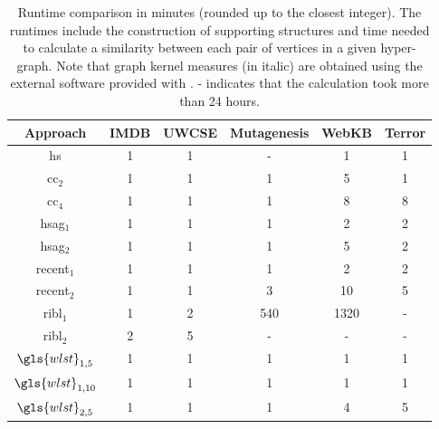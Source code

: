 \begin{table}
	\begin{center}
		\small
		\caption[Runtime comparison of various relational clustering approaches]{Runtime comparison in minutes (rounded up to the closest integer). The runtimes include the construction of supporting structures and time needed to calculate a similarity between each pair of vertices in a given hyper-graph. Note that graph kernel measures (in italic) are obtained using the external software provided with \cite{NIPS2015_5688}. - indicates that the calculation took more than 24 hours. }
			\label{tab:Runtimes}
		\begin{tabular}[htb]{@{}cccccc@{}}
		\toprule
		\textbf{Approach } & \textbf{IMDB}     & \textbf{UWCSE} &   \textbf{Mutagenesis}   &   \textbf{WebKB}   &  \textbf{Terror} \\
		\midrule
		\gls{hs} 		 		&	1		&	1	   &  	-	  &		1	   &   	1		\\

		\gls{cc}$_2$ 			&	1		&	1      &  	1	  &		5	   &   	1		\\

		\gls{cc}$_4$ 			&	1		&	1	   &  	1	  &		8	   &   	8		\\

		\gls{hsag}$_1$ 		&	1		&	1	   &  1		  &		2	   &   	2		\\

		\gls{hsag}$_2$ 		&	1		&	1	   &  1		  &		5	   &   	2		\\

		\gls{recent}$_1$		&	1		&	1	   &  	1	  &		2	   &   	2		\\

		\gls{recent}$_2$		&	1		&	1	   &  	3	  &		10	   &   	5		\\

		\gls{ribl}$_1$		&	1		&	2	   &  	540	  &		1320   &   	-		\\

		\gls{ribl}$_2$		&	2		&	5	   &  -	  &		-	   &   	-		\\

		$\gls{wlst}_{1,5}$	&	1		&	1	   &  	1	  &		1	   &   	1		\\

		$\gls{wlst}_{1,10}$	&	1		&	1	   &  	1	  &		1	   &   	1		\\

		$\gls{wlst}_{2,5}$	&	1		&	1	   &  	1	  &		4	   &   	5		\\


\end{tabular}
\end{center}
\end{table}
